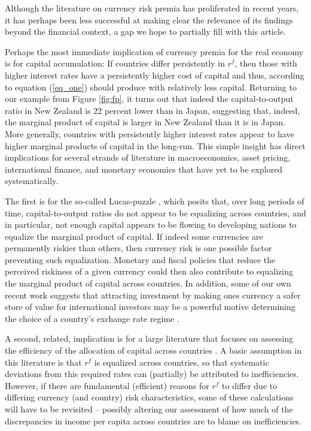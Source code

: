 \documentclass{ar-1col}
\begin{document}
Although the literature on currency risk premia has proliferated in recent years, it has perhaps been less successful at making clear the relevance of its findings beyond the financial context, a gap we hope to partially fill with this article.

Perhaps the most immediate implication of currency premia for the real economy is for capital accumulation: If countries differ persistently in $r^f$, then those with higher interest rates have a persistently higher cost of capital and thus, according to equation (\ref{eq_one}) should produce with relatively less capital. Returning to our example from Figure \ref{fig:fp}, it turns out that indeed the capital-to-output ratio in New Zealand is 22 percent lower than in Japan, suggesting that, indeed, the marginal product of capital is larger in New Zealand than it is in Japan. More generally, countries with persistently higher interest rates appear to have higher marginal products of capital in the long-run. This simple insight has direct implications for several strands of literature in macroeconomics, asset pricing, international finance, and monetary economics that have yet to be explored systematically.

The first is for the so-called Lucas-puzzle \citep{Lucas1990}, which posits that, over long periods of time, capital-to-output ratios do not appear to be equalizing across countries, and in particular, not enough capital appears to be flowing to developing nations to equalize the marginal product of capital. If indeed some currencies are permanently riskier than others, then currency risk is one possible factor preventing such equalization. Monetary and fiscal policies that reduce the perceived riskiness of a given currency could then also contribute to equalizing the marginal product of capital across countries. In addition, some of our own recent work suggests that attracting investment by making ones currency a safer store of value for international investors may be a powerful motive determining the choice of a country's exchange rate regime .

A second, related, implication is for a large literature that focuses on assessing the efficiency of the allocation of capital across countries \citep{HallJones1997, CaselliFeyrer2007}. A basic assumption in this literature is that $r^f$ is equalized across countries, so that systematic deviations from this required rates can (partially) be attributed to inefficiencies. However, if there are fundamental (efficient) reasons for $r^f$ to differ due to differing currency (and country) risk characteristics, some of these calculations will have to be revisited -- possibly altering our assessment of how much of the discrepancies in income per capita across countries are to blame on inefficiencies.
\end{document}

